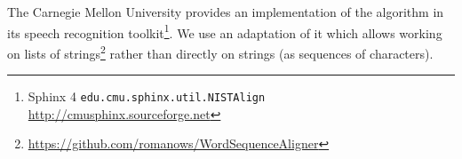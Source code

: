 


The Carnegie Mellon University provides an implementation of the algorithm in its speech recognition toolkit\footnote{Sphinx 4 \texttt{edu.cmu.sphinx.util.NISTAlign} %
\url{http://cmusphinx.sourceforge.net}}.
We use an adaptation of it which allows working on lists of strings\footnote{\url{https://github.com/romanows/WordSequenceAligner}} rather than directly on strings (as sequences of characters).









